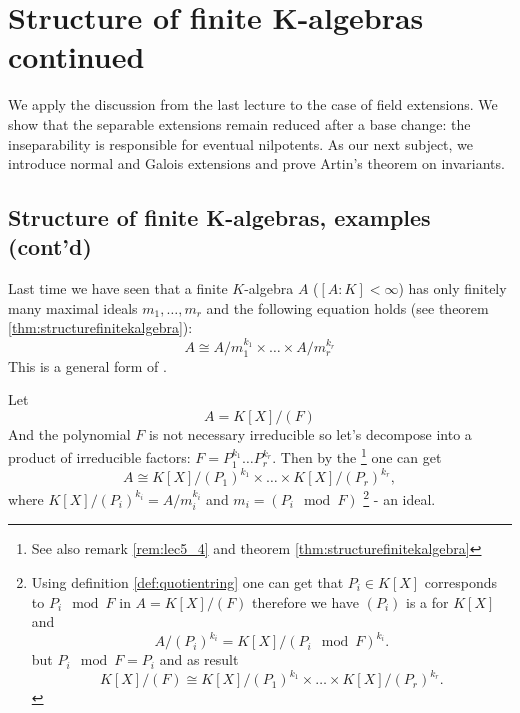 \chapter{Structure of finite K-algebras continued}

We apply the discussion from the last lecture to the case of field
extensions. We show that the separable extensions remain reduced after
a base change: the inseparability is responsible for eventual
nilpotents. As our next subject, we introduce normal and Galois
extensions and prove Artin's theorem on invariants.

\section{Structure of finite K-algebras, examples (cont'd)}

Last time we have seen that a finite $K$-algebra $A$
($\left[A:K\right] < \infty$) has only finitely many maximal ideals
$m_1, \dots, m_r$ and the following equation holds (see theorem
\ref{thm:structurefinitekalgebra}):
\[
A \cong A/m_1^{k_1} \times \dots \times A/m_r^{k_r}
\]
This is a general form of .

\begin{example}
  Let
  \[
  A = K\left[X\right]/\left(F\right)
  \]
  And the polynomial $F$ is not necessary
  irreducible so let's decompose into a product of irreducible
  factors:  $F= P_1^{k_1} \dots P_r^{k_r}$.
  Then by the  
  \footnote{
    See also remark \ref{rem:lec5_4} and theorem
    \ref{thm:structurefinitekalgebra}
  }
  one can get
  \[
  A \cong
  K\left[X\right]/\left(P_1\right)^{k_1} \times \dots
  \times K\left[X\right]/\left(P_r\right)^{k_r},
  \]
  where $K\left[X\right]/\left(P_i\right)^{k_i} = A/m_i^{k_i}$ and
  $m_i = \left( P_i \mod F \right)$
  \footnote{
    Using definition \ref{def:quotientring} one can get that
    $P_i \in K\left[X\right]$ corresponds to
    $P_i \mod F$ in $A = K\left[X\right]/\left(F\right)$ therefore 
    we have $\left(P_i\right)$ is a  for
    $K\left[X\right]$ and 
    \[
    A/\left(P_i\right)^{k_i} =
    K\left[X\right]/\left(P_i \mod F \right)^{k_i}.
    \]
    but $P_i \mod F  = P_i$ and as result
    \[
    K\left[X\right]/\left(F\right) \cong
    K\left[X\right]/\left(P_1\right)^{k_1} \times \dots
    \times K\left[X\right]/\left(P_r\right)^{k_r}.
    \]
  }
  - an ideal.
  \label{ex:lec5_1}
\end{example}

